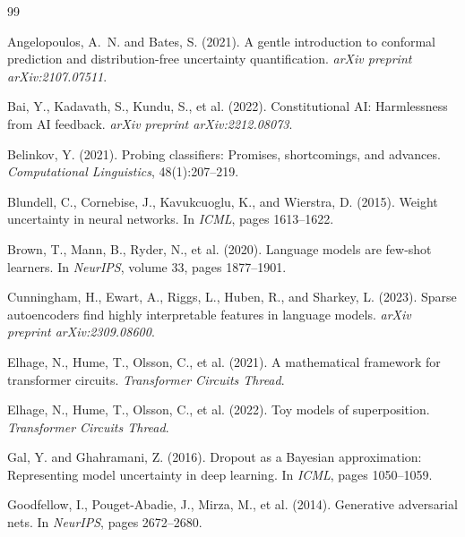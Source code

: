 \documentclass[11pt,a4paper]{article}
\begin{document}

\begin{thebibliography}{99}

Angelopoulos, A.~N. and Bates, S. (2021).
\newblock A gentle introduction to conformal prediction and distribution-free uncertainty quantification.
\newblock \emph{arXiv preprint arXiv:2107.07511}.

Bai, Y., Kadavath, S., Kundu, S., et al. (2022).
\newblock Constitutional AI: Harmlessness from AI feedback.
\newblock \emph{arXiv preprint arXiv:2212.08073}.

Belinkov, Y. (2021).
\newblock Probing classifiers: Promises, shortcomings, and advances.
\newblock \emph{Computational Linguistics}, 48(1):207--219.

Blundell, C., Cornebise, J., Kavukcuoglu, K., and Wierstra, D. (2015).
\newblock Weight uncertainty in neural networks.
\newblock In \emph{ICML}, pages 1613--1622.

Brown, T., Mann, B., Ryder, N., et al. (2020).
\newblock Language models are few-shot learners.
\newblock In \emph{NeurIPS}, volume 33, pages 1877--1901.

Cunningham, H., Ewart, A., Riggs, L., Huben, R., and Sharkey, L. (2023).
\newblock Sparse autoencoders find highly interpretable features in language models.
\newblock \emph{arXiv preprint arXiv:2309.08600}.

Elhage, N., Hume, T., Olsson, C., et al. (2021).
\newblock A mathematical framework for transformer circuits.
\newblock \emph{Transformer Circuits Thread}.

Elhage, N., Hume, T., Olsson, C., et al. (2022).
\newblock Toy models of superposition.
\newblock \emph{Transformer Circuits Thread}.

Gal, Y. and Ghahramani, Z. (2016).
\newblock Dropout as a Bayesian approximation: Representing model uncertainty in deep learning.
\newblock In \emph{ICML}, pages 1050--1059.

Goodfellow, I., Pouget-Abadie, J., Mirza, M., et al. (2014).
\newblock Generative adversarial nets.
\newblock In \emph{NeurIPS}, pages 2672--2680.


\end{thebibliography}
\end{document}
